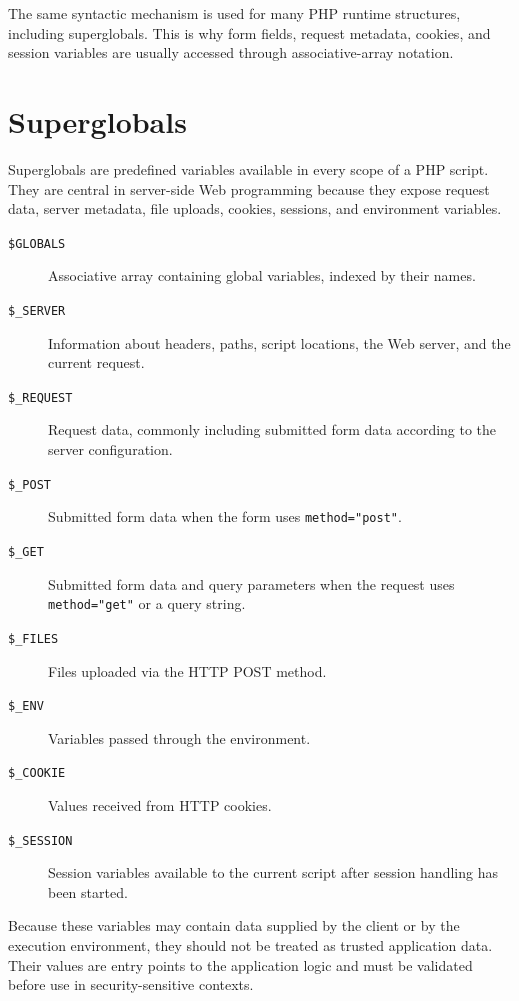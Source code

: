 \documentclass{scrbook}
\begin{document}
	The same syntactic mechanism is used for many PHP runtime structures, including superglobals. This is why form fields, request metadata, cookies, and session variables are usually accessed through associative-array notation.
	
	\section{Superglobals}
	
	Superglobals are predefined variables available in every scope of a PHP script. They are central in server-side Web programming because they expose request data, server metadata, file uploads, cookies, sessions, and environment variables.
	
	\begin{description}
		\item[\texttt{\$GLOBALS}] Associative array containing global variables, indexed by their names.
		
		\item[\texttt{\$\_SERVER}] Information about headers, paths, script locations, the Web server, and the current request.
		
		\item[\texttt{\$\_REQUEST}] Request data, commonly including submitted form data according to the server configuration.
		
		\item[\texttt{\$\_POST}] Submitted form data when the form uses \texttt{method="post"}.
		
		\item[\texttt{\$\_GET}] Submitted form data and query parameters when the request uses \texttt{method="get"} or a query string.
		
		\item[\texttt{\$\_FILES}] Files uploaded via the HTTP POST method.
		
		\item[\texttt{\$\_ENV}] Variables passed through the environment.
		
		\item[\texttt{\$\_COOKIE}] Values received from HTTP cookies.
		
		\item[\texttt{\$\_SESSION}] Session variables available to the current script after session handling has been started.
	\end{description}
	
	Because these variables may contain data supplied by the client or by the execution environment, they should not be treated as trusted application data. Their values are entry points to the application logic and must be validated before use in security-sensitive contexts.
	
\end{document}
